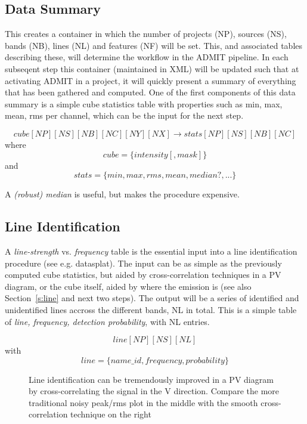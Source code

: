 \documentclass[preprint]{aastex} %
\begin{document}
\subsection{Data Summary}

This creates a container in which the number of projects (NP),
sources (NS), bands (NB), lines (NL) and features (NF) will be set. 
This, and 
associated tables describing these, will determine the workflow in the
ADMIT pipeline. In each subseqent step this container (maintained in XML) will
be updated such that at activating ADMIT in a project, it will quickly
present a summary of everything that has been gathered and computed. One of
the first components of this data summary is a 
simple cube statistics table with properties such as 
min, max, mean, rms per channel, which can be the input for the next step.

$$
cube[NP][NS][NB][NC][NY][NX] \rightarrow stats[NP][NS][NB][NC]
$$
where 
$$
     cube = \{ intensity [, mask] \}
$$
and
$$
stats = \{min,max,rms,mean,median?,...\}
$$

A {\it (robust) median} is useful, but makes the procedure expensive.


\subsection{Line Identification}

A {\it line-strength} vs. {\it frequency} table is the essential input
into a line identification procedure (see e.g. datasplat).
The input can be as simple as the previously computed cube statistics, 
but aided by cross-correlation techniques in a PV diagram, or the cube itself,
aided by where the emission is (see also Section~\ref{s:line} and next two steps).
The output will be a series of identified and unidentified lines accross the different
bands, NL in total. This is a simple table of 
{\it line, frequency, detection probability}, with NL entries.

$$
    line[NP][NS][NL]
$$
with
$$
    line = \{name\_id, frequency, probability\}
$$


\begin{figure}[ht]
\caption{Line identification can be tremendously improved in a PV diagram
by cross-correlating the signal in the V direction. Compare the more traditional
noisy peak/rms plot in the middle with the smooth cross-correlation technique on
the right}
\label{fig:pvcorr4}
\end{figure}
\end{document}
